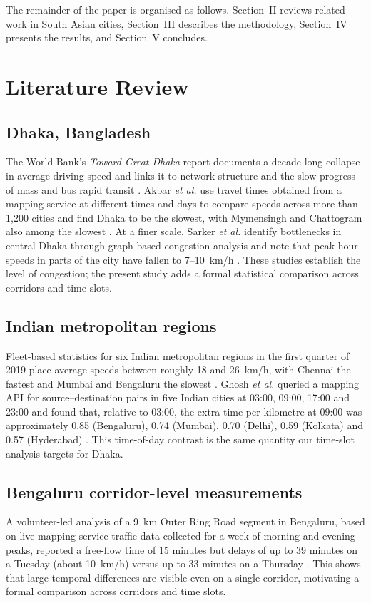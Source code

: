 \documentclass[conference]{IEEEtran}
\begin{document}
The remainder of the paper is organised as follows. Section~II reviews related work in South Asian cities, Section~III describes the methodology, Section~IV presents the results, and Section~V concludes.

\section{Literature Review}
\subsection{Dhaka, Bangladesh}
The World Bank's \emph{Toward Great Dhaka} report documents a decade-long collapse in average driving speed and links it to network structure and the slow progress of mass and bus rapid transit \cite{worldbank2018dhaka}. Akbar \emph{et al.} use travel times obtained from a mapping service at different times and days to compare speeds across more than 1{,}200 cities and find Dhaka to be the slowest, with Mymensingh and Chattogram also among the slowest \cite{akbar2023fast}. At a finer scale, Sarker \emph{et al.} identify bottlenecks in central Dhaka through graph-based congestion analysis and note that peak-hour speeds in parts of the city have fallen to 7--10~km/h \cite{sarker2025bottleneck}. These studies establish the level of congestion; the present study adds a formal statistical comparison across corridors and time slots.

\subsection{Indian metropolitan regions}
Fleet-based statistics for six Indian metropolitan regions in the first quarter of 2019 place average speeds between roughly 18 and 26~km/h, with Chennai the fastest and Mumbai and Bengaluru the slowest \cite{moveinsync2019}. Ghosh \emph{et al.} queried a mapping API for source--destination pairs in five Indian cities at 03:00, 09:00, 17:00 and 23:00 and found that, relative to 03:00, the extra time per kilometre at 09:00 was approximately 0.85 (Bengaluru), 0.74 (Mumbai), 0.70 (Delhi), 0.59 (Kolkata) and 0.57 (Hyderabad) \cite{ghosh2020eco}. This time-of-day contrast is the same quantity our time-slot analysis targets for Dhaka.

\subsection{Bengaluru corridor-level measurements}
A volunteer-led analysis of a 9~km Outer Ring Road segment in Bengaluru, based on live mapping-service traffic data collected for a week of morning and evening peaks, reported a free-flow time of 15 minutes but delays of up to 39 minutes on a Tuesday (about 10~km/h) versus up to 33 minutes on a Thursday \cite{citizenmatters}. This shows that large temporal differences are visible even on a single corridor, motivating a formal comparison across corridors and time slots.
\end{document}
